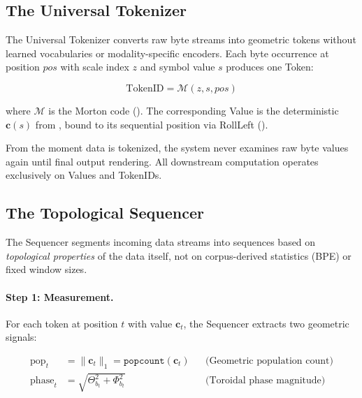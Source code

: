 \subsection{The Universal Tokenizer}
\label{sec:universal_tokenizer}
\label{sec:tokenizer_sequencer}

The Universal Tokenizer converts raw byte streams into geometric tokens
without learned vocabularies or modality-specific encoders.  Each byte
occurrence at position $\textit{pos}$ with scale index $z$ and symbol
value $s$ produces one Token:

\begin{equation}
  \text{TokenID} = \mathcal{M}(z, s, \textit{pos})
  \label{eq:token_id}
\end{equation}

\noindent where $\mathcal{M}$ is the Morton code ().
The corresponding Value is the deterministic $\mathbf{c}(s)$ from
, bound to its sequential position via RollLeft
().

From the moment data is tokenized, the system never examines raw byte
values again until final output rendering.  All downstream computation
operates exclusively on Values and TokenIDs.

\subsection{The Topological Sequencer}
\label{sec:sequencer}

The Sequencer segments incoming data streams into sequences based on
\emph{topological properties} of the data itself, not on corpus-derived
statistics (BPE) or fixed window sizes.

\paragraph{Step 1: Measurement.}
For each token at position $t$ with value $\mathbf{c}_t$, the Sequencer
extracts two geometric signals:

\begin{align}
  \text{pop}_t &= \|\mathbf{c}_t\|_1 = \texttt{popcount}(\mathbf{c}_t)
  &&\text{(Geometric population count)}
  \label{eq:pop} \\[4pt]
  \text{phase}_t &= \sqrt{\Theta_{b_t}^2 + \Phi_{b_t}^2}
  &&\text{(Toroidal phase magnitude)}
  \label{eq:phase_mag}
\end{align}


